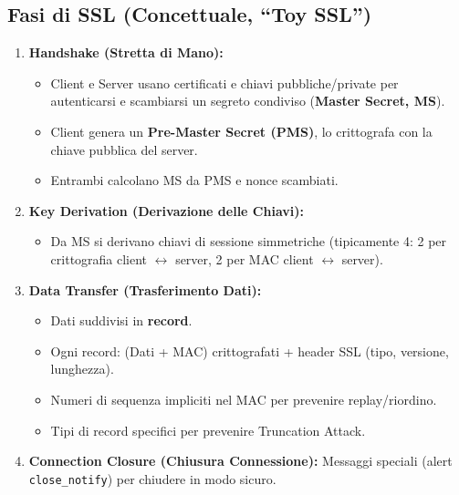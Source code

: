 \documentclass{article}
\begin{document}
\subsection{Fasi di SSL (Concettuale, \textquotedblleft Toy SSL\textquotedblright{})}
\begin{enumerate}
    \item \textbf{Handshake (Stretta di Mano):}
    \begin{itemize}
        \item Client e Server usano certificati e chiavi pubbliche/private per autenticarsi e scambiarsi un segreto condiviso (\textbf{Master Secret, MS}).
        \item Client genera un \textbf{Pre-Master Secret (PMS)}, lo crittografa con la chiave pubblica del server.
        \item Entrambi calcolano MS da PMS e nonce scambiati.
    \end{itemize}
    \item \textbf{Key Derivation (Derivazione delle Chiavi):}
    \begin{itemize}
        \item Da MS si derivano chiavi di sessione simmetriche (tipicamente 4: 2 per crittografia client $\leftrightarrow$ server, 2 per MAC client $\leftrightarrow$ server).
    \end{itemize}
    \item \textbf{Data Transfer (Trasferimento Dati):}
    \begin{itemize}
        \item Dati suddivisi in \textbf{record}.
        \item Ogni record: (Dati + MAC) crittografati + header SSL (tipo, versione, lunghezza).
        \item Numeri di sequenza impliciti nel MAC per prevenire replay/riordino.
        \item Tipi di record specifici per prevenire Truncation Attack.
    \end{itemize}
    \item \textbf{Connection Closure (Chiusura Connessione):}
    Messaggi speciali (alert \texttt{close\_notify}) per chiudere in modo sicuro.
\end{enumerate}
\end{document}
